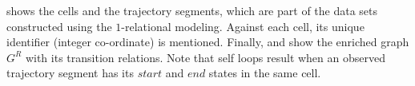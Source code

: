      shows the cells and the trajectory segments, which
    are part of the data sets constructed using the $1$-relational
    modeling. Against each cell, its unique identifier (integer
    co-ordinate) is mentioned.  Finally,  and
     show the enriched graph $G^R$ with its transition
    relations. Note that self loops result when an observed trajectory
    segment has its $start$ and $end$ states in the same cell.





